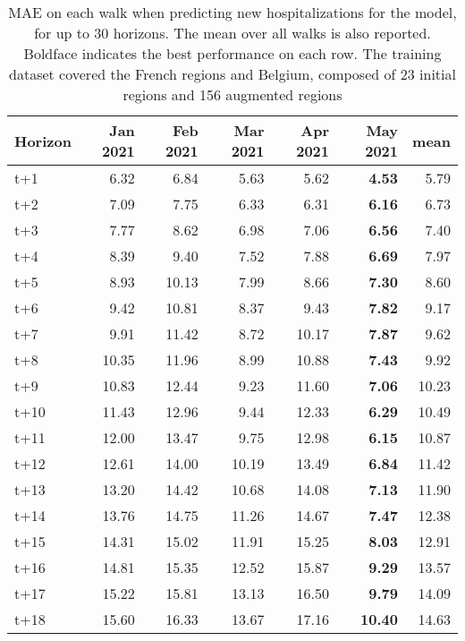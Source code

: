 \begin{table}[H]
\centering
\caption{MAE on each walk when predicting new hospitalizations for the model, for up to 30 horizons. The mean over all walks is also reported. Boldface indicates the best performance on each row. The training dataset covered the French regions and Belgium, composed of 23 initial regions and 156 augmented regions }
\label{tab:MAE_walk_assembly_0}
\begin{tabular}{lrrrrrr}
\toprule
Horizon &  Jan 2021 &  Feb 2021 &  Mar 2021 &  Apr 2021 &  May 2021 &  mean \\
\midrule
t+1  & 6.32  & 6.84  & 5.63  & 5.62  & \textbf{4.53}  & 5.79  \\
t+2  & 7.09  & 7.75  & 6.33  & 6.31  & \textbf{6.16}  & 6.73  \\
t+3  & 7.77  & 8.62  & 6.98  & 7.06  & \textbf{6.56}  & 7.40  \\
t+4  & 8.39  & 9.40  & 7.52  & 7.88  & \textbf{6.69}  & 7.97  \\
t+5  & 8.93  & 10.13  & 7.99  & 8.66  & \textbf{7.30}  & 8.60  \\
t+6  & 9.42  & 10.81  & 8.37  & 9.43  & \textbf{7.82}  & 9.17  \\
t+7  & 9.91  & 11.42  & 8.72  & 10.17  & \textbf{7.87}  & 9.62  \\
t+8  & 10.35  & 11.96  & 8.99  & 10.88  & \textbf{7.43}  & 9.92  \\
t+9  & 10.83  & 12.44  & 9.23  & 11.60  & \textbf{7.06}  & 10.23  \\
t+10  & 11.43  & 12.96  & 9.44  & 12.33  & \textbf{6.29}  & 10.49  \\
t+11  & 12.00  & 13.47  & 9.75  & 12.98  & \textbf{6.15}  & 10.87  \\
t+12  & 12.61  & 14.00  & 10.19  & 13.49  & \textbf{6.84}  & 11.42  \\
t+13  & 13.20  & 14.42  & 10.68  & 14.08  & \textbf{7.13}  & 11.90  \\
t+14  & 13.76  & 14.75  & 11.26  & 14.67  & \textbf{7.47}  & 12.38  \\
t+15  & 14.31  & 15.02  & 11.91  & 15.25  & \textbf{8.03}  & 12.91  \\
t+16  & 14.81  & 15.35  & 12.52  & 15.87  & \textbf{9.29}  & 13.57  \\
t+17  & 15.22  & 15.81  & 13.13  & 16.50  & \textbf{9.79}  & 14.09  \\
t+18  & 15.60  & 16.33  & 13.67  & 17.16  & \textbf{10.40}  & 14.63  \\

\end{tabular}
\end{table}
